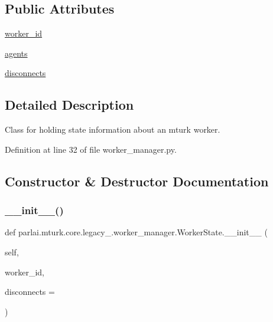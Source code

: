 \subsection*{Public Attributes}
\begin{DoxyCompactItemize}
\item 
\hyperlink{classparlai_1_1mturk_1_1core_1_1legacy__2018_1_1worker__manager_1_1WorkerState_ac69bbf7c4bfd34eb297ae091523f46b5}{worker\+\_\+id}
\item 
\hyperlink{classparlai_1_1mturk_1_1core_1_1legacy__2018_1_1worker__manager_1_1WorkerState_a4165b5a0b9ffcbd8194fd10adeb02fdb}{agents}
\item 
\hyperlink{classparlai_1_1mturk_1_1core_1_1legacy__2018_1_1worker__manager_1_1WorkerState_ac510ecfdd12ff572cb5ad16629dbd36e}{disconnects}
\end{DoxyCompactItemize}


\subsection{Detailed Description}
\begin{DoxyVerb}Class for holding state information about an mturk worker.
\end{DoxyVerb}
 

Definition at line 32 of file worker\+\_\+manager.\+py.



\subsection{Constructor \& Destructor Documentation}
\mbox{\label{classparlai_1_1mturk_1_1core_1_1legacy__2018_1_1worker__manager_1_1WorkerState_a1f84cd0e83112d5758bdb17b0793f309}} 
\subsubsection{\texorpdfstring{\+\_\+\+\_\+init\+\_\+\+\_\+()}{\_\_init\_\_()}}
{\footnotesize\ttfamily def parlai.\+mturk.\+core.\+legacy\+\_.\+worker\+\_\+manager.\+Worker\+State.\+\_\+\+\_\+init\+\_\+\+\_\+ (\begin{DoxyParamCaption}\item[{}]{self,  }\item[{}]{worker\+\_\+id,  }\item[{}]{disconnects = {} }\end{DoxyParamCaption})}

